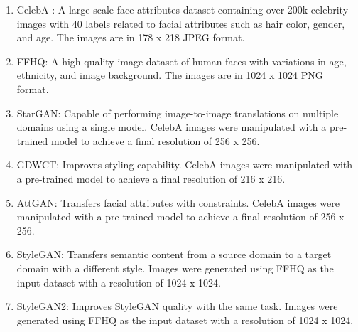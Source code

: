         \begin{enumerate}
            \item CelebA : A large-scale face attributes dataset containing over 200k celebrity images with 40 labels related to facial attributes such as hair color, gender, and age. The images are in 178 x 218 JPEG format.
            
            \item FFHQ: A high-quality image dataset of human faces with variations in age, ethnicity, and image background. The images are in 1024 x 1024 PNG format.
            
            \item StarGAN: Capable of performing image-to-image translations on multiple domains using a single model. CelebA images were manipulated with a pre-trained model to achieve a final resolution of 256 x 256.
            
            \item GDWCT: Improves styling capability. CelebA images were manipulated with a pre-trained model to achieve a final resolution of 216 x 216.
    
            \item AttGAN: Transfers facial attributes with constraints. CelebA images were manipulated with a pre-trained model to achieve a final resolution of 256 x 256.
        
            \item StyleGAN: Transfers semantic content from a source domain to a target domain with a different style. Images were generated using FFHQ as the input dataset with a resolution of 1024 x 1024.
        
            \item StyleGAN2: Improves StyleGAN quality with the same task. Images were generated using FFHQ as the input dataset with a resolution of 1024 x 1024.
        \end{enumerate}

